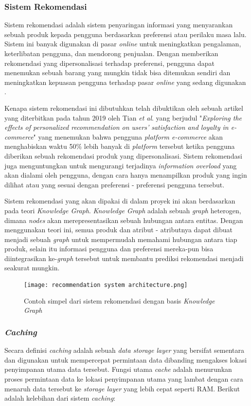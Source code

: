 \documentclass[a4paper]{article}
\newcommand{\subsubbab}[1]{%
    \subsubsection{#1}%
}
\begin{document}
\subsubbab{Sistem Rekomendasi}
Sistem rekomendasi adalah sistem penyaringan informasi yang menyarankan sebuah produk kepada pengguna berdasarkan preferensi atau perilaku masa lalu. Sistem ini banyak digunakan di pasar \textit{online} untuk meningkatkan pengalaman, keterlibatan pengguna, dan mendorong penjualan. Dengan memberikan rekomendasi yang dipersonalisasi terhadap preferensi, pengguna dapat menemukan sebuah barang yang mungkin tidak bisa ditemukan sendiri dan meningkatkan kepuasan pengguna terhadap pasar \textit{online} yang sedang digunakan \autocite{adiwardana2019}.

Kenapa sistem rekomendasi ini dibutuhkan telah dibuktikan oleh sebuah artikel yang diterbitkan pada tahun 2019 oleh Tian \textit{et al}. yang berjudul "\textit{Exploring the effects of personalized recommendation on users' satisfaction and loyalty in e-commerce}" yang menemukan bahwa pengguna \textit{platform e-commerce}  akan menghabiskan waktu 50\% lebih banyak di \textit{platform} tersebut ketika pengguna diberikan sebuah rekomendasi produk yang dipersonalisasi\autocite{tian2019exploring}. Sistem rekomendasi juga menguntungkan untuk mengurangi terjadinya \textit{information overload} yang akan dialami oleh pengguna, dengan cara hanya menampilkan produk yang ingin dilihat atau yang sesuai dengan preferensi - preferensi pengguna tersebut\autocite{karimi2018news}.

Sistem rekomendasi yang akan dipakai di dalam proyek ini akan berdasarkan pada teori \textit{Knowledge Graph}. \textit{Knowledge Graph} adalah sebuah \textit{graph} heterogen, dimana \textit{nodes} akan merepresentasikan sebuah hubungan antara entitas\autocite{guo2020survey}. Dengan menggunakan teori ini, semua produk dan atribut - atributnya dapat dibuat menjadi sebuah \textit{graph} untuk mempermudah memahami hubungan antara tiap produk, selain itu informasi pengguna dan preferensi mereka-pun bisa diintegrasikan ke-\textit{graph} tersebut untuk membantu prediksi rekomendasi menjadi seakurat mungkin.

\begin{figure}[h]
    \centering
    \texttt{[image: recommendation system architecture.png]}
    \caption{Contoh simpel dari sistem rekomendasi dengan basis \textit{Knowledge Graph}}
\end{figure}

\subsubbab{\textit{Caching}}
Secara definisi \textit{caching} adalah sebuah \textit{data storage layer} yang bersifat sementara dan digunakan untuk mempercepat permintaan data dibanding mengakses lokasi penyimpanan utama data tersebut. Fungsi utama \textit{cache} adalah menurunkan proses permintaan data ke lokasi penyimpanan utama yang lambat dengan cara menaruh data tersebut ke \textit{storage layer} yang lebih cepat seperti RAM\autocite{AWS-caching}. Berikut adalah kelebihan dari sistem \textit{caching}:
\end{document}
